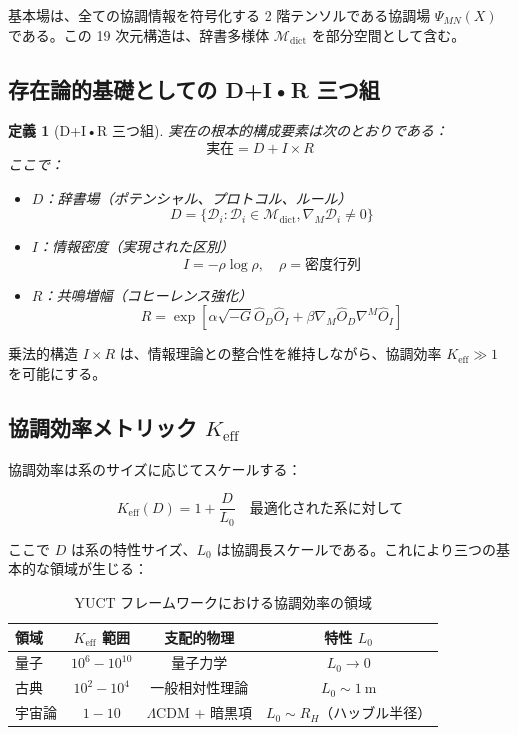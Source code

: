 \documentclass[11pt,a4paper]{article}
\newcommand{\Mdict}{\mathcal{M}_{\text{dict}}}
\newcommand{\Dict}{\mathcal{D}}
\newtheorem{definition}[theorem]{定義}
\theoremstyle{remark}
\newcommand{\Keff}{K_{\mathrm{eff}}}
\begin{document}
	基本場は、全ての協調情報を符号化する 2 階テンソルである協調場 $\Psi_{MN}(X)$ である。この 19 次元構造は、辞書多様体 $\Mdict$ を部分空間として含む。
	
	\subsection{存在論的基礎としての D+I•R 三つ組}
	
	\begin{definition}[D+I•R 三つ組]
		実在の根本的構成要素は次のとおりである：
		\[
		\text{実在} = D + I \times R
		\]
		ここで：
		\begin{itemize}
			\item $D$：辞書場（ポテンシャル、プロトコル、ルール）
			\[
			D = \{\Dict_i : \Dict_i \in \Mdict, \nabla_M \Dict_i \neq 0\}
			\]
			\item $I$：情報密度（実現された区別）
			\[
			I = -\rho \log \rho, \quad \rho = \text{密度行列}
			\]
			\item $R$：共鳴増幅（コヒーレンス強化）
			\[
			R = \exp\left[\alpha \sqrt{-G} \hat{O}_D \hat{O}_I + \beta \nabla_M\hat{O}_D \nabla^M\hat{O}_I\right]
			\]
		\end{itemize}
	\end{definition}
	
	乗法的構造 $I \times R$ は、情報理論との整合性を維持しながら、協調効率 $\Keff \gg 1$ を可能にする。
	
	\subsection[協調効率メトリック K eff]{協調効率メトリック $\Keff$}
	
	協調効率は系のサイズに応じてスケールする：
	
	\begin{equation}
		\Keff(D) = 1 + \frac{D}{L_0} \quad \text{最適化された系に対して}
	\end{equation}
	
	ここで $D$ は系の特性サイズ、$L_0$ は協調長スケールである。これにより三つの基本的な領域が生じる：
	
	\begin{table}[htbp]
		\centering
		\begin{tabular}{lccc}
			\toprule
			\textbf{領域} & \textbf{$\Keff$ 範囲} & \textbf{支配的物理} & \textbf{特性 $L_0$} \\
			\midrule
			量子 & $10^6 - 10^{10}$ & 量子力学 & $L_0 \to 0$ \\
			古典 & $10^2 - 10^4$ & 一般相対性理論 & $L_0 \sim 1\ \text{m}$ \\
			宇宙論 & $1 - 10$ & $\Lambda$CDM + 暗黒項 & $L_0 \sim R_H$（ハッブル半径） \\
			\bottomrule
		\end{tabular}
		\caption{YUCT フレームワークにおける協調効率の領域}
		\label{tab:keff-regimes}
	\end{table}
	
\end{document}

